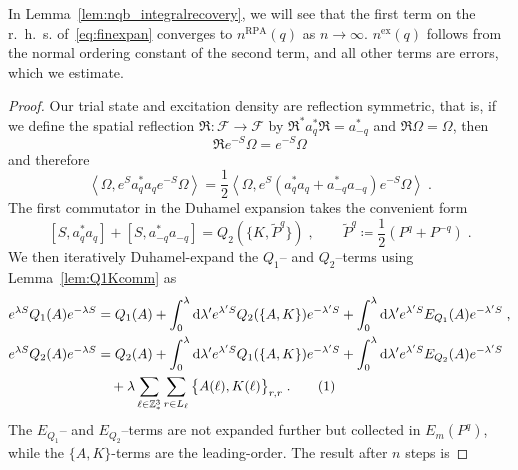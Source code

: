 \documentclass[12pt,a4paper]{article}
\numberwithin{equation}{section}
\newcommand{\cF}{\mathcal{F}}
\newcommand{\fR}{\mathfrak{R}}
\newcommand{\1}{\mathbb{I}}
\newcommand{\di}{\textnormal{d}}
\newcommand{\ex}{\mathrm{ex}}
\newcommand{\RPA}{\mathrm{RPA}}
\newcommand{\tagg}[1]{ \stepcounter{equation} \tag{\theequation}
\label{#1} } %
\newcommand{\Z}{\mathbb{Z}}
\newcommand{\half}{\frac{1}{2}}
\newcommand{\eva}[1]{\left\langle #1 \right\rangle}
\theoremstyle{plain}
\theoremstyle{definition}
\theoremstyle{remark}
\theoremstyle{plain}
\theoremstyle{definition}
\theoremstyle{remark}
\begin{document}
In Lemma~\ref{lem:nqb_integralrecovery}, we will see that the first term on the r.~h.~s. of~\eqref{eq:finexpan} converges to $ n^{\RPA}(q) $ as $ n \to \infty $. $ n^{\ex}(q) $ follows from the normal ordering constant of the second term, and all other terms are errors, which we estimate.


\begin{proof}
Our trial state and excitation density are reflection symmetric, that is, if we define the spatial reflection $ \fR: \cF \to \cF $ by $ \fR^* a_q^* \fR = a^*_{-q} $ and $ \fR \Omega = \Omega $, then
\begin{equation} \label{eq:reflectionsymmetry}
	\fR e^{-S} \Omega = e^{-S} \Omega
\end{equation}
and therefore
\begin{equation}
	\eva{\Omega, e^{S} a_q^* a_q e^{-S} \Omega} = \half \eva{\Omega, e^{S} (a_q^* a_q + a_{-q}^* a_{-q}) e^{-S} \Omega} \;.
\end{equation}
The first commutator in the Duhamel expansion takes the convenient form
\begin{equation} \label{eq:firstcommutator}
	[S, a_q^* a_q] + [S, a_{-q}^* a_{-q}]
	= Q_2(\{K,\tilde{P}^q\}) \;, \qquad
	\tilde{P}^q \coloneq \half(P^q + P^{-q}) \;.
\end{equation}
We then iteratively Duhamel-expand the $ Q_1$-- and $ Q_2 $--terms using Lemma~\ref{lem:Q1Kcomm} as 
\begin{align*}
	e^{\lambda S} Q_1(A) e^{-\lambda S}
	&= Q_1(A) + \int_0^{\lambda} \di \lambda' e^{\lambda' S} Q_2(\{A,K\}) e^{-\lambda' S}
		+ \int_0^{\lambda} \di \lambda' e^{\lambda' S} E_{Q_1}(A) e^{-\lambda' S} \;, \\
	e^{\lambda S} Q_2(A) e^{-\lambda S}
	&= Q_2(A) + \int_0^{\lambda} \di \lambda' e^{\lambda' S} Q_1(\{A,K\}) e^{-\lambda' S}
		+ \int_0^{\lambda} \di \lambda' e^{\lambda' S} E_{Q_2}(A) e^{-\lambda' S} \\
	&\quad + \lambda \sum_{\ell \in \Z^3_*} \sum_{r \in L_{\ell}} \big\{ A(\ell), K(\ell) \big\}_{r,r} \;. \tagg{eq:expand}
\end{align*}
The $ E_{Q_1}$-- and $ E_{Q_2} $--terms are not expanded further but collected in $ E_m(P^q) $, while the $ \{A,K\} $-terms are the leading-order. The result after $ n $ steps is

\end{proof}
\end{document}
